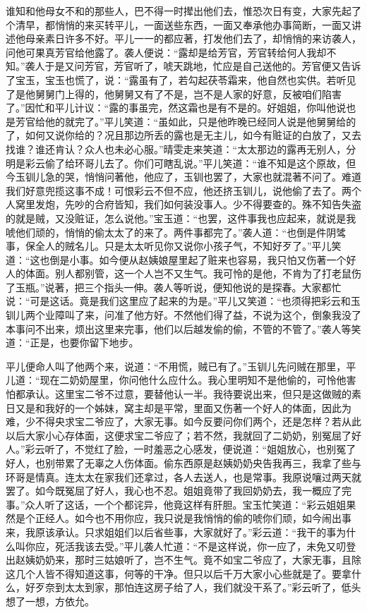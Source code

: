 \begin{parag}
    谁知和他母女不和的那些人，巴不得一时撵出他们去，惟恐次日有变，大家先起了个清早，都悄悄的来买转平儿，一面送些东西，一面又奉承他办事简断，一面又讲述他母亲素日许多不好。平儿一一的都应著，打发他们去了，却悄悄的来访袭人，问他可果真芳官给他露了。袭人便说：“露却是给芳官，芳官转给何人我却不知。”袭人于是又问芳官，芳官听了，唬天跳地，忙应是自己送他的。芳官便又告诉了宝玉，宝玉也慌了，说：“露虽有了，若勾起茯苓霜来，他自然也实供。若听见了是他舅舅门上得的，他舅舅又有了不是，岂不是人家的好意，反被咱们陷害了。”因忙和平儿计议：“露的事虽完，然这霜也是有不是的。好姐姐，你叫他说也是芳官给他的就完了。”平儿笑道：“虽如此，只是他昨晚已经同人说是他舅舅给的了，如何又说你给的？况且那边所丢的露也是无主儿，如今有赃证的白放了，又去找谁？谁还肯认？众人也未必心服。”晴雯走来笑道：“太太那边的露再无别人，分明是彩云偷了给环哥儿去了。你们可瞎乱说。”平儿笑道：“谁不知是这个原故，但今玉钏儿急的哭，悄悄问著他，他应了，玉钏也罢了，大家也就混著不问了。难道我们好意兜揽这事不成！可恨彩云不但不应，他还挤玉钏儿，说他偷了去了。两个人窝里发炮，先吵的合府皆知，我们如何装没事人。少不得要查的。殊不知告失盗的就是贼，又没赃证，怎么说他。”宝玉道：“也罢，这件事我也应起来，就说是我唬他们顽的，悄悄的偷太太了的来了。两件事都完了。”袭人道：“也倒是件阴骘事，保全人的贼名儿。只是太太听见你又说你小孩子气，不知好歹了。”平儿笑道：“这也倒是小事。如今便从赵姨娘屋里起了赃来也容易，我只怕又伤著一个好人的体面。别人都别管，这一个人岂不又生气。我可怜的是他，不肯为了打老鼠伤了玉瓶。”说著，把三个指头一伸。袭人等听说，便知他说的是探春。大家都忙说：“可是这话。竟是我们这里应了起来的为是。”平儿又笑道：“也须得把彩云和玉钏儿两个业障叫了来，问准了他方好。不然他们得了益，不说为这个，倒象我没了本事问不出来，烦出这里来完事，他们以后越发偷的偷，不管的不管了。”袭人等笑道：“正是，也要你留下地步。
\end{parag}


\begin{parag}
    平儿便命人叫了他两个来，说道：“不用慌，贼已有了。”玉钏儿先问贼在那里，平儿道：“现在二奶奶屋里，你问他什么应什么。我心里明知不是他偷的，可怜他害怕都承认。这里宝二爷不过意，要替他认一半。我待要说出来，但只是这做贼的素日又是和我好的一个姊妹，窝主却是平常，里面又伤著一个好人的体面，因此为难，少不得央求宝二爷应了，大家无事。如今反要问你们两个，还是怎样？若从此以后大家小心存体面，这便求宝二爷应了；若不然，我就回了二奶奶，别冤屈了好人。”彩云听了，不觉红了脸，一时羞恶之心感发，便说道：“姐姐放心，也别冤了好人，也别带累了无辜之人伤体面。偷东西原是赵姨奶奶央告我再三，我拿了些与环哥是情真。连太太在家我们还拿过，各人去送人，也是常事。我原说嚷过两天就罢了。如今既冤屈了好人，我心也不忍。姐姐竟带了我回奶奶去，我一概应了完事。”众人听了这话，一个个都诧异，他竟这样有肝胆。宝玉忙笑道：“彩云姐姐果然是个正经人。如今也不用你应，我只说是我悄悄的偷的唬你们顽，如今闹出事来，我原该承认。只求姐姐们以后省些事，大家就好了。”彩云道：“我干的事为什么叫你应，死活我该去受。”平儿袭人忙道：“不是这样说，你一应了，未免又叨登出赵姨奶奶来，那时三姑娘听了，岂不生气。竟不如宝二爷应了，大家无事，且除这几个人皆不得知道这事，何等的干净。但只以后千万大家小心些就是了。要拿什么，好歹奈到太太到家，那怕连这房子给了人，我们就没干系了。”彩云听了，低头想了一想，方依允。
\end{parag}


